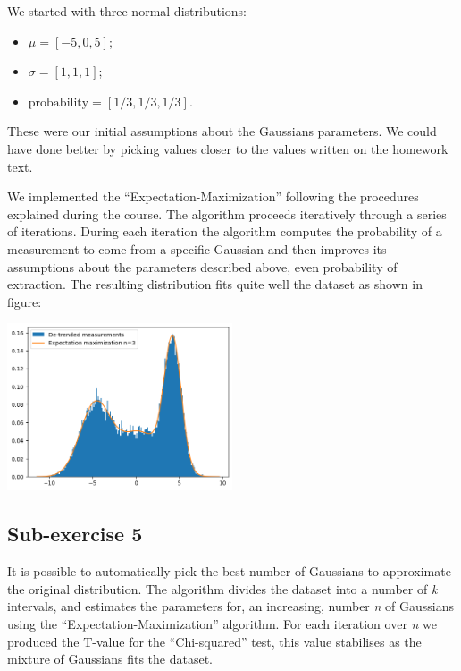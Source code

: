\documentclass[10pt,a4paper]{article}
\begin{document}
We started with three normal distributions:
\begin{itemize}
\item \(\mu = [-5, 0, 5]\);
\item \(\sigma = [1, 1, 1]\);
\item \(\text{probability} = [1/3, 1/3, 1/3]\).
\end{itemize}

These were our initial assumptions about the Gaussians parameters. We could have done better by picking values closer to the values written on the homework text.

We implemented the ``Expectation-Maximization'' following the procedures explained during the course. The algorithm proceeds iteratively through a series of iterations. During each iteration the algorithm computes the probability of a measurement to come from a specific Gaussian and then improves its assumptions about the parameters described above, even probability of extraction. The resulting distribution fits quite well the dataset as shown in figure:

\begin{center}
  \includegraphics[width=0.5\textwidth]{point4.png}
\end{center}

\subsection*{Sub-exercise 5}

It is possible to automatically pick the best number of Gaussians to approximate the original distribution. The algorithm divides the dataset into a number of \emph{k} intervals, and estimates the parameters for, an increasing, number \emph{n} of Gaussians using the ``Expectation-Maximization'' algorithm. For each iteration over \emph{n} we produced the T-value for the ``Chi-squared'' test, this value stabilises as the mixture of Gaussians fits the dataset.%
\end{document}
